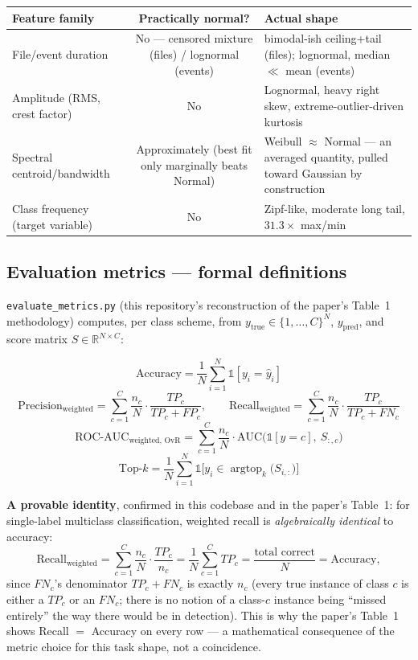 \documentclass[11pt]{article}
\begin{document}
\begin{table}[h]
\centering
\begin{tabularx}{\textwidth}{l c Y}
\toprule
Feature family & Practically normal? & Actual shape \\
\midrule
File/event duration & No --- censored mixture (files) / lognormal (events) & bimodal-ish ceiling+tail (files); lognormal, median $\ll$ mean (events) \\
Amplitude (RMS, crest factor) & No & Lognormal, heavy right skew, extreme-outlier-driven kurtosis \\
Spectral centroid/bandwidth & Approximately (best fit only marginally beats Normal) & Weibull $\approx$ Normal --- an averaged quantity, pulled toward Gaussian by construction \\
Class frequency (target variable) & No & Zipf-like, moderate long tail, $31.3\times$ max/min \\
\bottomrule
\end{tabularx}
\end{table}

\subsection{Evaluation metrics --- formal definitions}
\label{sec:A6}

\texttt{evaluate\_metrics.py} (this repository's reconstruction of the
paper's Table~1 methodology) computes, per class scheme, from
$y_{\text{true}}\in\{1,\dots,C\}^N$, $y_{\text{pred}}$, and score matrix
$S\in\mathbb{R}^{N\times C}$:

\[
\text{Accuracy} = \frac{1}{N}\sum_{i=1}^N \mathbb{1}[y_i=\hat y_i]
\]
\[
\text{Precision}_{\text{weighted}} = \sum_{c=1}^C \frac{n_c}{N}\cdot\frac{TP_c}{TP_c+FP_c},
\qquad
\text{Recall}_{\text{weighted}} = \sum_{c=1}^C \frac{n_c}{N}\cdot\frac{TP_c}{TP_c+FN_c}
\]
\[
\text{ROC-AUC}_{\text{weighted, OvR}} = \sum_{c=1}^C \frac{n_c}{N}\cdot\text{AUC}\big(\mathbb{1}[y=c],\ S_{:,c}\big)
\]
\[
\text{Top-}k = \frac{1}{N}\sum_{i=1}^N \mathbb{1}\Big[y_i \in \operatorname{argtop}_k\big(S_{i,:}\big)\Big]
\]

\textbf{A provable identity}, confirmed in this codebase and in the paper's
Table~1: for single-label multiclass classification, weighted recall is
\emph{algebraically identical} to accuracy:
\[
\text{Recall}_{\text{weighted}} = \sum_{c=1}^C \frac{n_c}{N}\cdot\frac{TP_c}{n_c}
= \frac{1}{N}\sum_{c=1}^C TP_c
= \frac{\text{total correct}}{N} = \text{Accuracy},
\]
since $FN_c$'s denominator $TP_c+FN_c$ is exactly $n_c$ (every true instance
of class $c$ is either a $TP_c$ or an $FN_c$; there is no notion of a
class-$c$ instance being ``missed entirely'' the way there would be in
detection). This is why the paper's Table~1 shows Recall $=$ Accuracy on
every row --- a mathematical consequence of the metric choice for this task
shape, not a coincidence.
\end{document}
